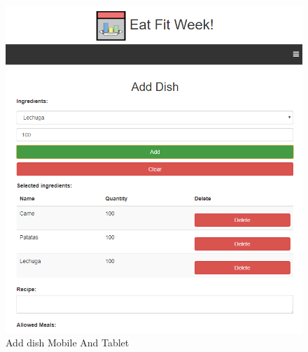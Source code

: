 \documentclass[12pt, a4paper, twoside]{book}
\begin{document}
	\begin{figure}[H]
		\centering
		\includegraphics[width=15cm]{Imagenes/MU-AddDishMobileTablet.png}
		\caption{Add dish Mobile And Tablet}\label{Add dish Mobile And Tablet}
	\end{figure}
\end{document}

